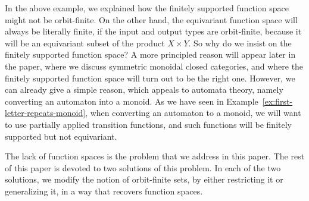 In the above example, we explained how the finitely supported function space might not be orbit-finite. On the other hand, the equivariant function space will always be literally finite, if the input and output types are orbit-finite, because it will be an equivariant subset of the product $X \times Y$. So why do we insist on the finitely supported function space? A more principled reason will appear later in the paper, where we discuss symmetric monoidal closed categories, and where the finitely supported function space will turn out to be the right one. However, we can already give a simple reason, which appeals to automata theory, namely converting an automaton into a monoid. As we have seen in Example~\ref{ex:first-letter-repeats-monoid}, when converting an automaton to a monoid, we will want to use partially applied transition functions, and such functions will be finitely supported but not equivariant. 



 

The lack of function spaces is the problem that we address in this paper. The rest of this paper is devoted to two solutions of this problem. In each of the two solutions, we modify the notion of orbit-finite sets, by either restricting it or generalizing it, in a way that recovers function spaces. 



